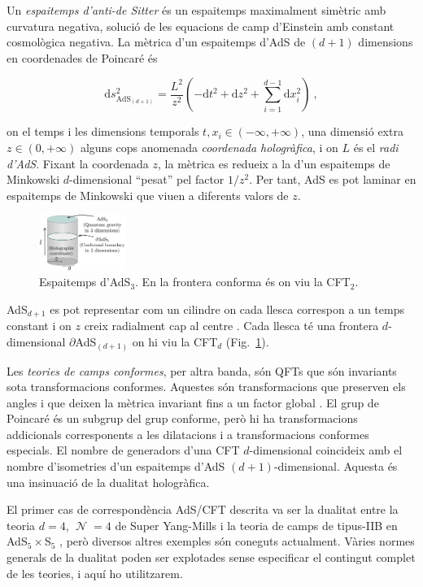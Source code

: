 \documentclass[twocolumn]{revtex4}
\providecommand{\eq}[2]{
    \begin{equation}
        #2
    \label{eq:#1}
    \end{equation}
}
\DeclareMathOperator{\calN}{\mathcal{N}}
\begin{document}
Un \emph{espaitemps d'anti-de Sitter} és un espaitemps maximalment simètric amb curvatura negativa, solució de les equacions de camp d'Einstein amb constant cosmològica negativa. La mètrica d'un espaitemps d'AdS de $(d+1)$ dimensions en coordenades de Poincaré és
\eq{AdS_PP-metric}{
\mathrm{d} s_{\text{AdS}_{(d+1)}}^2 = \frac{L^2}{z^2} \left( -\mathrm{d} t^2 + \mathrm{d} z^2 + \sum_{i=1}^{d-1} \mathrm{d} x_i^2 \right) \ ,
}
on el temps i les dimensions temporals $t , x_i \in (-\infty,+\infty)$, una dimensió extra $z \in (0,+\infty)$ alguns cops anomenada \emph{coordenada hologràfica}, i on $L$ és el \emph{radi d'AdS}. Fixant la coordenada $z$, la mètrica es redueix a la d'un espaitemps de Minkowski $d$-dimensional ``pesat'' pel factor $1/z^2$. Per tant, AdS es pot laminar en espaitemps de Minkowski que viuen a diferents valors de $z$.

\begin{figure}
\centering
\includegraphics[width=0.25\textwidth]{../../Imatges/AdS_Cylindric.png}
\caption{Espaitemps d'AdS$_3$. En la frontera conforma és on viu la CFT$_2$.}
\label{fig:AdS}
\end{figure}

AdS$_{d+1}$ es pot representar com un cilindre on cada llesca correspon a un temps constant i on $z$ creix radialment cap al centre \cite{hawking_large_2008}. Cada llesca té una frontera $d$-dimensional $\partial$AdS$_{(d+1)}$ on hi viu la CFT$_d$ (Fig.~\ref{fig:AdS}).

Les \emph{teories de camps conformes}, per altra banda, són QFTs que són invariants sota transformacions conformes. Aquestes són transformacions que preserven els angles i que deixen la mètrica invariant fins a un factor global \cite{di_francesco_conformal_1997}. El grup de Poincaré és un subgrup del grup conforme, però hi ha transformacions addicionals corresponents a les dilatacions i a transformacions conformes especials. El nombre de generadors d'una CFT $d$-dimensional coincideix amb el nombre d'isometries d'un espaitemps d'AdS $(d+1)$-dimensional. Aquesta és una insinuació de la dualitat hologràfica.

El primer cas de correspondència AdS/CFT descrita va ser la dualitat entre la teoria $d=4$, $\calN=4$ de Super Yang-Mills i la teoria de camps de tipus-IIB en AdS$_5 \times $S$_5$ \cite{maldacena_large_1999}, però diversos altres exemples són coneguts actualment. Vàries normes generals de la dualitat poden ser explotades sense especificar el contingut complet de les teories, i aquí ho utilitzarem.
\end{document}
